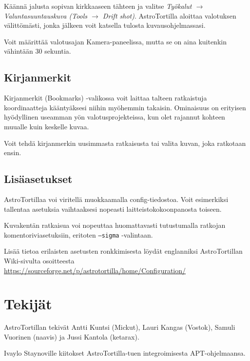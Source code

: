 \documentclass{article}
\newcommand{\surl}[1]{{\small \url{#1}}}
\begin{document}
Käännä jalusta sopivan kirkkaaseen tähteen ja valitse
\emph{Työkalut $\rightarrow$
Valuntasuuntauskuva (Tools $\rightarrow$ Drift shot)}. AstroTortilla aloittaa valotuksen välittömästi, jonka jälkeen voit katsella tulosta
kuvausohjelmassasi.

Voit määrittää valotusajan Kamera-paneelissa, mutta se on aina kuitenkin vähintään 30 sekuntia.

\subsection{Kirjanmerkit}

Kirjanmerkit (Bookmarks) -valikossa voit laittaa talteen ratkaistuja koordinaatteja kääntyäksesi niihin myöhemmin takaisin.
Ominaisuus on erityisen hyödyllinen useamman yön valotusprojekteissa, kun olet rajannut kohteen muualle kuin keskelle kuvaa.

Voit tehdä kirjanmerkin uusimmasta ratkaisusta tai valita kuvan, joka ratkotaan ensin.

\subsection{Lisäasetukset}

AstroTortillaa voi viritellä muokkaamalla config-tiedostoa. Voit esimerkiksi tallentaa asetuksia vaihtaaksesi nopeasti laitteistokokoonpanosta toiseen.

Kuvakentän ratkaisua voi nopeuttaa huomattavasti tutustumalla ratkojan komentoriviasetuksiin, eritoten \texttt{--sigma} -valintaan.

Lisää tietoa erilaisten asetusten ronkkimisesta löydät englanniksi AstroTortillan Wiki-sivulta osoitteesta \surl{https://sourceforge.net/p/astrotortilla/home/Configuration/}

\section{Tekijät}

AstroTortillan tekivät Antti Kuntsi (Mickut), Lauri Kangas (Vostok), Samuli Vuorinen (naavis) ja Jussi Kantola (ketarax).

Ivaylo Staynoville kiitokset AstroTortilla-tuen integroimisesta APT-ohjelmaansa.
\end{document}
